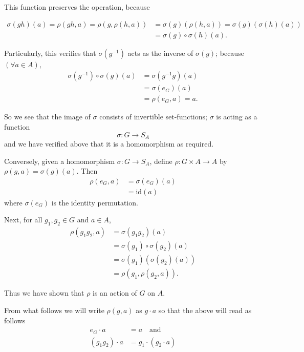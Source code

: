 This function preserves the operation, because

\begin{align*}
\sigma(gh)(a) = \rho(gh, a) = \rho(g, \rho(h, a))
&= \sigma(g)(\rho(h,a)) = \sigma(g)(\sigma(h)(a)) \\
&= \sigma(g) \circ \sigma(h)(a).
\end{align*}


Particularly, this verifies that $\sigma(g^{-1})$ acts as the inverse of $\sigma(g)$; because $(\forall a \in A)$,
\begin{align*}
\sigma(g^{-1}) \circ \sigma(g)(a) &= \sigma(g^{-1}g)(a) \\
&= \sigma(e_G)(a) \\
&= \rho(e_G, a) = a.
\end{align*}

\vspace{1em}

\noindent So we see that the image of $\sigma$ consists of invertible set-functions; $\sigma$ is acting as a function
\[
\sigma : G \longrightarrow S_A
\]
and we have verified above that it is a homomorphism as required.

Conversely, given a homomorphism $\sigma : G \longrightarrow S_A$, define $\rho : G \times A \longrightarrow A$ by $\rho(g,a) = \sigma(g)(a)$. Then
\begin{align*}
\rho(e_G, a) &= \sigma(e_G)(a) \\
&= \text{id}(a)
\end{align*}
where $\sigma(e_G)$ is the identity permutation.

\vspace{2em}

\noindent Next, for all $g_1, g_2 \in G$ and $a \in A$,
\begin{align*}
\rho(g_1 g_2, a) &= \sigma(g_1 g_2)(a) \\
&= \sigma(g_1) \circ \sigma(g_2)(a) \\
&= \sigma(g_1)(\sigma(g_2)(a)) \\
&= \rho(g_1, \rho(g_2, a)).
\end{align*}


Thus we have shown that $\rho$ is an action of $G$ on $A$.

From what follows we will write $\rho(g,a)$ as $g \cdot a$ so that the above will read as follows
\[
\boxed{
\begin{aligned}
e_G \cdot a &= a \quad \text{and} \\
(g_1 g_2) \cdot a &= g_1 \cdot (g_2 \cdot a)
\end{aligned}
}
\]

